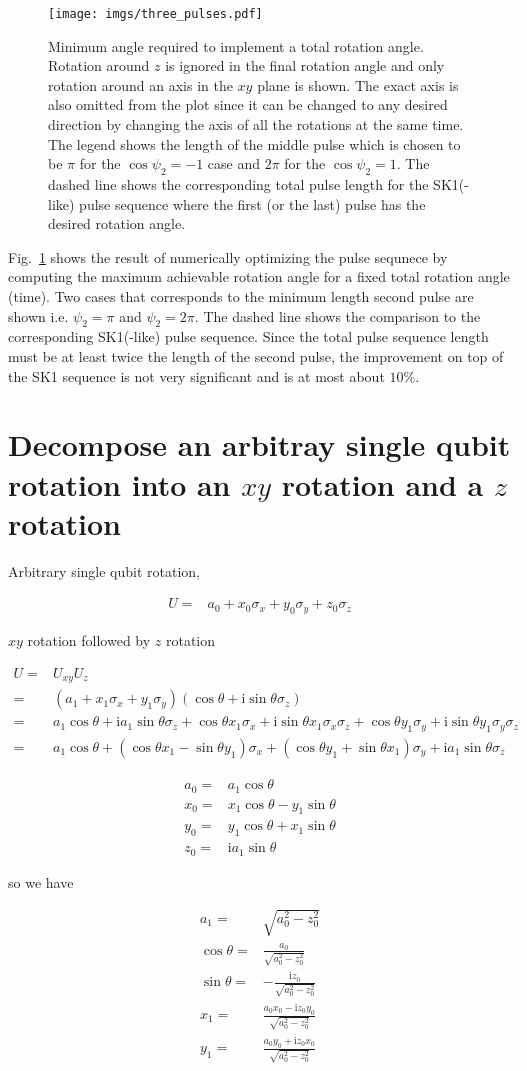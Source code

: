 \documentclass[10pt,fleqn]{article}
\newcommand{\ui}{\mathrm{i}}
\newcommand{\eqar}[1]
{
  \begin{align*}
    #1
  \end{align*}
}
\newcommand{\paren}[1]{{\left({#1}\right)}}
\begin{document}
\begin{figure}[h]
  \centering
  \texttt{[image: imgs/three\_pulses.pdf]}
  \caption{Minimum angle required to implement a total rotation angle.
    Rotation around $z$ is ignored in the final rotation angle and only rotation
    around an axis in the $xy$ plane is shown.
    The exact axis is also omitted from the plot since it can be changed to any
    desired direction by changing the axis of all the rotations at the same time.
    The legend shows the length of the middle pulse which is chosen to be $\pi$
    for the $\cos\psi_2=-1$ case and $2\pi$ for the $\cos\psi_2=1$.
    The dashed line shows the corresponding total pulse length for the SK1(-like)
    pulse sequence where the first (or the last) pulse
    has the desired rotation angle.}
  \label{fig:three-pulses}
\end{figure}

Fig.~\ref{fig:three-pulses} shows the result of numerically optimizing
the pulse sequnece by computing the maximum achievable rotation angle
for a fixed total rotation angle (time). Two cases that corresponds to
the minimum length second pulse are shown i.e. $\psi_2=\pi$ and $\psi_2=2\pi$.
The dashed line shows the comparison to the corresponding SK1(-like) pulse sequence.
Since the total pulse sequence length must be at least
twice the length of the second pulse, the improvement on top of the SK1 sequence
is not very significant and is at most about $10\%$.

\clearpage
\appendix
\section{Decompose an arbitray single qubit rotation into an $xy$ rotation
  and a $z$ rotation}

Arbitrary single qubit rotation,
\eqar{
  U=&a_0 + x_0 \sigma_x + y_0 \sigma_y + z_0 \sigma_z
}
$xy$ rotation followed by $z$ rotation
\eqar{
  U=&U_{xy} U_z\\
  =&\paren{a_1 + x_1 \sigma_x + y_1 \sigma_y}\paren{\cos\theta + \ui\sin\theta\sigma_z}\\
  =&a_1\cos\theta + \ui a_1\sin\theta \sigma_z + \cos\theta x_1 \sigma_x + \ui\sin\theta x_1 \sigma_x\sigma_z + \cos\theta y_1 \sigma_y + \ui\sin\theta y_1 \sigma_y\sigma_z\\
  =&a_1\cos\theta + \paren{\cos\theta x_1 - \sin\theta y_1} \sigma_x + \paren{\cos\theta y_1 + \sin\theta x_1} \sigma_y + \ui a_1\sin\theta \sigma_z
}
\eqar{
  a_0=&a_1\cos\theta\\
  x_0=&x_1\cos\theta - y_1\sin\theta\\
  y_0=&y_1\cos\theta + x_1\sin\theta\\
  z_0=&\ui a_1\sin\theta
}
so we have
\eqar{
  a_1=&\sqrt{a_0^2-z_0^2}\\
  \cos\theta=&\frac{a_0}{\sqrt{a_0^2-z_0^2}}\\
  \sin\theta=&-\frac{\ui z_0}{\sqrt{a_0^2-z_0^2}}\\
  x_1=&\frac{a_0x_0-\ui z_0y_0}{\sqrt{a_0^2-z_0^2}}\\
  y_1=&\frac{a_0y_0+\ui z_0x_0}{\sqrt{a_0^2-z_0^2}}
}
\end{document}
